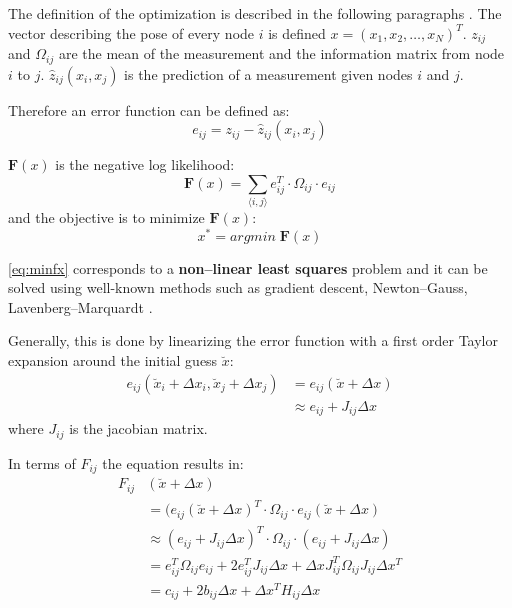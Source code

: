 The definition of the optimization is described in the following paragraphs . The vector describing the pose of every node $i$ is defined $x = (x_1,x_2,\ldots,x_N)^T$. $z_{ij}$ and $\Omega_{ij}$ are the mean of the measurement and the information matrix from node $i$ to $j$. $\hat{z}_{ij}(x_i,x_j)$ is the prediction of a measurement given nodes $i$ and $j$.

Therefore an error function can be defined as:
\begin{equation}
  e_{ij} = z_{ij} - \hat{z}_{ij}(x_i,x_j)
  \label{eq:error}
\end{equation}  

$\mathbf{F}(x)$ is the negative log likelihood:
\begin{equation}
  \mathbf{F}(x) = \sum\limits_{\langle i,j \rangle}e_{ij}^T\cdot \Omega_{ij}\cdot e_{ij}
  \label{eq:fx}
\end{equation}  
and the objective is to minimize $\mathbf{F}(x)$:
\begin{equation}
  x^* = argmin\;\mathbf{F}(x)
  \label{eq:minfx}
\end{equation}  

\autoref{eq:minfx} corresponds to a \textbf{non--linear least squares} problem and it can be solved using well-known methods such as gradient descent, Newton--Gauss, Lavenberg--Marquardt .

Generally, this is done by linearizing the error function with a first order Taylor expansion around the initial guess $\breve{x}$:
\begin{equation}
  \begin{split}
    e_{ij}(\breve{x}_i + \Delta x_i, \breve{x}_j + \Delta x_j) & = e_{ij}(\breve{x} + \Delta x) \\
                                                                & \approx e_{ij} + J_{ij}\Delta x
  \end{split}  
  \label{eq:taylorerror}
\end{equation}
where $J_{ij}$ is the jacobian matrix.

In terms of $F_{ij}$ the equation results in:
\begin{equation}
  \begin{split}
    F_{ij}& (\breve{x}+\Delta x)\\
          & = (e_{ij}(\breve{x} + \Delta x)^T\cdot \Omega_{ij}\cdot e_{ij}(\breve{x} + \Delta x) \\
          & \approx (e_{ij} + J_{ij}\Delta x)^T\cdot \Omega_{ij}\cdot (e_{ij} + J_{ij}\Delta x) \\
          & = e_{ij}^T\Omega_{ij}e_{ij} + 2e_{ij}^TJ_{ij}\Delta x + \Delta x J_{ij}^T \Omega_{ij} J_{ij} \Delta x^T \\
          & = c_{ij} + 2b_{ij}\Delta x + \Delta x^T H_{ij} \Delta x
  \end{split}  
  \label{eq:fij}
\end{equation}

